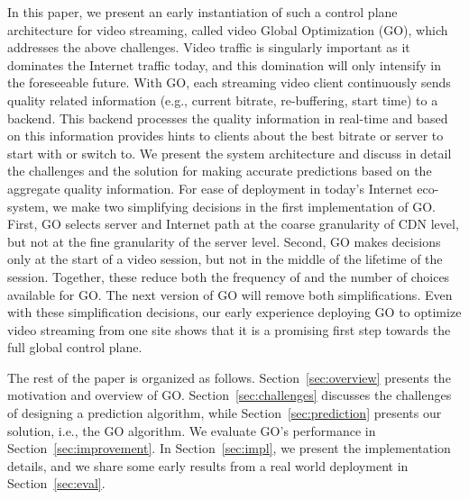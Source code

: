 In this paper, we present an early instantiation of such a control plane architecture for video streaming, called video Global Optimization (GO), which addresses the above challenges.  Video traffic is singularly important as it dominates the Internet traffic today, and this domination will only intensify in the foreseeable future. With GO, each streaming video client continuously sends quality related information (e.g., current bitrate, re-buffering, start time) to a backend. This backend processes the quality information in real-time and based on this information provides hints to clients about the best bitrate or server to start with or switch to. We present the system architecture and discuss in detail the challenges and the solution for making accurate predictions based on the aggregate quality information. For ease of deployment in today's Internet eco-system, we make two simplifying decisions in the first implementation of GO.  First, GO selects server and Internet path at the coarse granularity of CDN level, but not at the fine granularity of the server level.  Second, GO makes decisions only at the start of a video session, but not in the middle of the lifetime of the session.  Together, these reduce both the frequency of and the number of choices available for GO.  The next version of GO will remove both simplifications. Even with these simplification decisions, our early experience deploying GO to optimize video streaming from one site shows that it is a promising first step towards the full global control plane. 
   
The rest of the paper is organized as follows. Section~\ref{sec:overview} presents the motivation and overview of GO. Section~\ref{sec:challenges} discusses the challenges of designing a prediction algorithm, while Section~\ref{sec:prediction} presents our solution, i.e., the GO algorithm. We evaluate GO's performance in Section~\ref{sec:improvement}. In Section~\ref{sec:impl}, we present the implementation details, and we share some early results from a real world deployment in Section~\ref{sec:eval}. 
